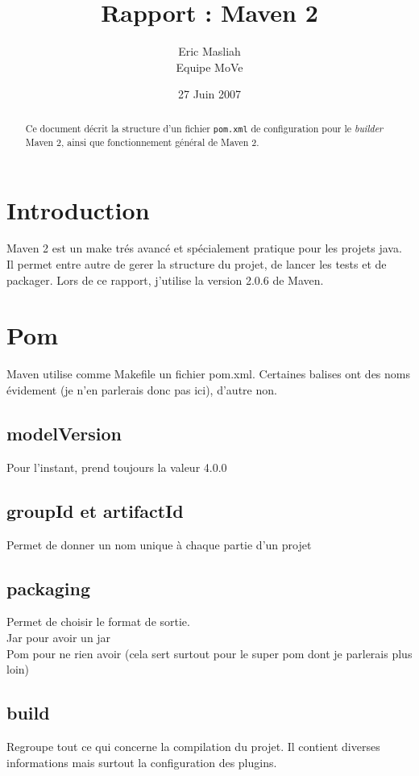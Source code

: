 \documentclass[a4paper,10pt]{article}
\title{Rapport : Maven 2}
\author{Eric Masliah\\
Equipe MoVe}
\date{27 Juin 2007}
\begin{document}
\maketitle

\begin{abstract}
Ce document décrit la structure d'un fichier \texttt{pom.xml} de configuration pour le \textit{builder} Maven 2, ainsi que fonctionnement général de Maven 2.
\end{abstract}


\section{Introduction}

Maven 2 est un make trés avancé et spécialement pratique pour les projets java.
Il permet entre autre de gerer la structure du projet, de lancer les tests et de packager.
Lors de ce rapport, j'utilise la version 2.0.6 de Maven.


\section{Pom}

Maven utilise comme Makefile un fichier pom.xml. Certaines balises ont des noms évidement (je n'en parlerais donc pas ici), d'autre non.

\subsection{modelVersion}
Pour l'instant, prend toujours la valeur 4.0.0

\subsection{groupId et artifactId}
Permet de donner un nom unique à chaque partie d'un projet

\subsection{packaging}
Permet de choisir le format de sortie.\\
Jar pour avoir un jar\\
Pom pour ne rien avoir (cela sert surtout pour le super pom dont je parlerais plus loin)

\subsection{build}
Regroupe tout ce qui concerne la compilation du projet. Il contient diverses informations mais surtout la configuration des plugins.
\end{document}
